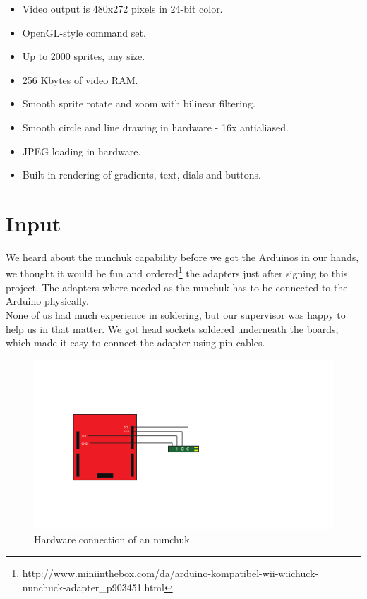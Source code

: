 \begin{multicols}{2}
\begin{itemize}
  \footnotesize
    \item Video output is 480x272 pixels in 24-bit color.
    \item OpenGL-style command set.
    \item Up to 2000 sprites, any size.
    \item 256 Kbytes of video RAM.
    \item Smooth sprite rotate and zoom with bilinear filtering.
    \item Smooth circle and line drawing in hardware - 16x antialiased.
    \item JPEG loading in hardware.
    \item Built-in rendering of gradients, text, dials and buttons.
  \end{itemize}
\end{multicols}

\section{Input}%
We heard about the nunchuk capability before we got the Arduinos in our
hands, we thought it would be fun and ordered\footnote{http://www.miniinthebox.com/da/arduino-kompatibel-wii-wiichuck-nunchuck-adapter\_p903451.html} the adapters just after signing
to this project. The adapters where needed as the nunchuk
has to be connected to the Arduino physically.
\\
None of us had much experience in soldering, but our supervisor was happy
to help us in that matter. We got head sockets soldered underneath
the boards, which made it easy to connect the adapter using pin cables.

\begin{figure}
  \begin{center}
     \includegraphics[scale=0.7]{Figures/NunchuckConnection}
  \end{center}
  \caption{Hardware connection of an nunchuk}
  \label{fig:nunchuk_connect}
\end{figure}




